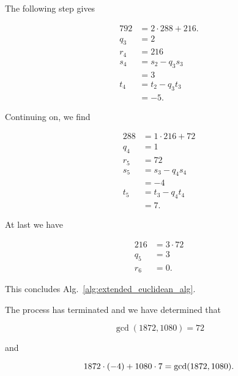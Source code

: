\begin{example}
\noindent
The following step gives

\begin{align}
    792 &= 2\cdot288 + 216.
        \nonumber\\
    q_{3} &= 2
        \nonumber\\
    r_{4} &= 216
        \nonumber\\
    s_{4} &= s_{2} - q_{3}s_{3}
            \nonumber\\
        &= 3
            \nonumber\\
    t_{4} &= t_{2} - q_{3}t_{3}
            \nonumber\\
        &= -5.
\end{align}

\noindent
Continuing on, we find

\begin{align}
    288 &= 1\cdot216 + 72
        \nonumber\\
    q_{4} &= 1
        \nonumber\\
    r_{5} &= 72
        \nonumber\\
    s_{5} &= s_{3} - q_{4}s_{4}
            \nonumber\\
        &= -4
            \nonumber\\
    t_{5} &= t_{3} - q_{4}t_{4}
            \nonumber\\
        &= 7.
\end{align}

\noindent
At last we have

\begin{align}
    216 &= 3\cdot 72
        \nonumber\\
    q_{5} &= 3
        \nonumber\\
    r_{6} &= 0.
\end{align}

\noindent
This concludes Alg.~\ref{alg:extended_euclidean_alg}.

The process has terminated and we have determined that

\begin{equation}
    \gcd(1872,1080) = 72
\end{equation}

\noindent
and

\begin{equation}
    1872\cdot\left( -4 \right) + 1080\cdot 7 = \gcd(1872,1080).
\end{equation}
\end{example}
